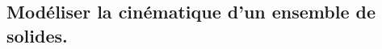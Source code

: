 \documentclass[10pt,fleqn]{article}
\newcommand{\repRel}{../..}
\newcommand{\repStyle}{\repRel/Style}
\newcommand{\td}{fichier_td}
\newcommand{\repExos}{\repRel/ExercicesCompetences}
\newcommand{\repExo}{dossier}
\begin{document}
\begin{multicols}{2}
\renewcommand{\repExo}{\repExos/B2_ProposerModele/B2_12_ModeliserSchemasCinematiques/18_Maxpid}
\renewcommand{\td}{18_Maxpid}
\graphicspath{{\repStyle/png/}{\repExo/images/}}


\renewcommand{\repExo}{\repExos/B2_ProposerModele/B2_12_ModeliserSchemasCinematiques/46_RR_RSG}
\renewcommand{\td}{46_RR_RSG}
\graphicspath{{\repStyle/png/}{\repExo/images/}}


\renewcommand{\repExo}{\repExos/B2_ProposerModele/B2_12_ModeliserSchemasCinematiques/513_Divers_Tabouret}
\renewcommand{\td}{513_Divers_Tabouret}
\graphicspath{{\repStyle/png/}{\repExo/images/}}


\renewcommand{\repExo}{\repExos/B2_ProposerModele/B2_12_ModeliserSchemasCinematiques/514_Divers_Tabouret}
\renewcommand{\td}{514_Divers_Tabouret}
\graphicspath{{\repStyle/png/}{\repExo/images/}}


\end{multicols}

\subsection{Modéliser la cinématique d'un ensemble de solides.} 
\end{document}
